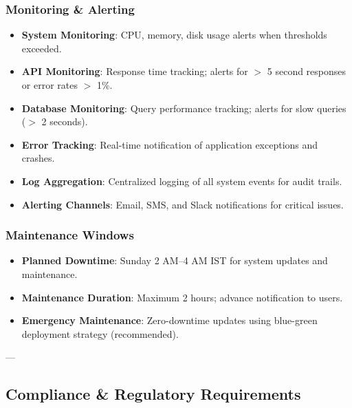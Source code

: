 \subsubsection{Monitoring \& Alerting}
\begin{itemize}
    \item \textbf{System Monitoring}: CPU, memory, disk usage alerts when thresholds exceeded.
    \item \textbf{API Monitoring}: Response time tracking; alerts for $>$ 5 second responses or error rates $>$ 1\%.
    \item \textbf{Database Monitoring}: Query performance tracking; alerts for slow queries ($>$ 2 seconds).
    \item \textbf{Error Tracking}: Real-time notification of application exceptions and crashes.
    \item \textbf{Log Aggregation}: Centralized logging of all system events for audit trails.
    \item \textbf{Alerting Channels}: Email, SMS, and Slack notifications for critical issues.
\end{itemize}

\subsubsection{Maintenance Windows}
\begin{itemize}
    \item \textbf{Planned Downtime}: Sunday 2 AM--4 AM IST for system updates and maintenance.
    \item \textbf{Maintenance Duration}: Maximum 2 hours; advance notification to users.
    \item \textbf{Emergency Maintenance}: Zero-downtime updates using blue-green deployment strategy (recommended).
\end{itemize}

---

\subsection{Compliance \& Regulatory Requirements}

